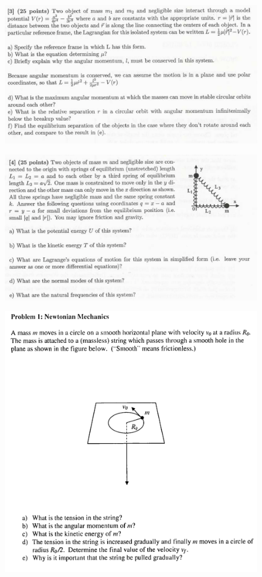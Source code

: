 \documentclass[10pt,a4paper]{article}
\begin{document}
 \newpage
\begin{figure}[H]
 \centering
 \includegraphics[width=16cm]{pdf/1-1T16.png}
\end{figure}
 \newpage
\begin{figure}[H]
 \centering
 \includegraphics[width=16cm]{pdf/1-1T17.png}
\end{figure}
 \newpage
\begin{figure}[H]
 \centering
 \includegraphics[width=16cm]{pdf/1-1T18.png}
\end{figure}
\end{document}
